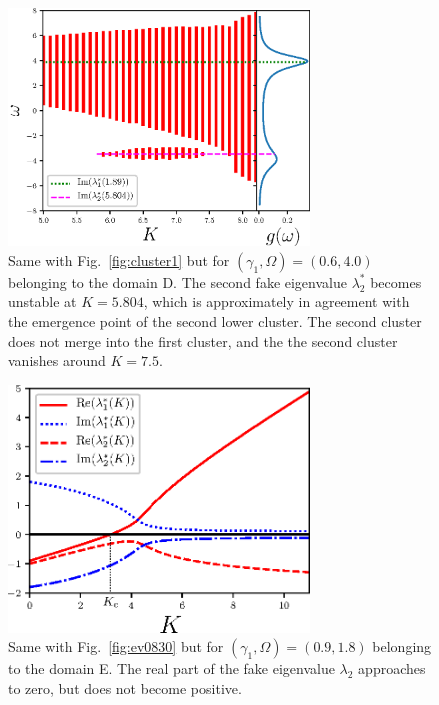 \begin{figure}[htbp]
\begin{center}
  \includegraphics[width=8cm]{figs/cluster3.eps}
\end{center}
  \caption{
    Same with Fig.~\ref{fig:cluster1} but for $(\gamma_{1},\Omega)=(0.6,4.0)$
    belonging to the domain D.
    The second fake eigenvalue $\lambda_{2}^{\ast}$
    becomes unstable at $K=5.804$,
    which is approximately in agreement with the emergence point of the second lower cluster.
    The second cluster does not merge
    into the first cluster,
    and the the second cluster vanishes around
    $K=7.5$.
    }
  \label{fig:cluster3}
\end{figure}

\begin{figure}[htbp]
\begin{center}
  \includegraphics[width=8cm]{figs/ev0918.eps}
\end{center}
  \caption{Same with Fig.~\ref{fig:ev0830}
    but for $(\gamma_{1},\Omega)=(0.9,1.8)$ belonging to the domain E.
    The real part of the fake eigenvalue $\lambda_{2}$ approaches to zero,
    but does not become positive.}
  \label{fig:ev0918}
\end{figure}


